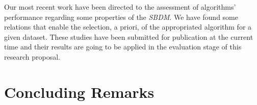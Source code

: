 \documentclass[citenumber]{elsarticle}
\begin{document}
	Our most recent work have been directed to the assessment of algorithms' performance regarding some properties of the \textit{SBDM}. We have found some relations that enable the selection, a priori, of the appropriated algorithm for a given dataset. These studies have been submitted for publication at the current time and their results are going to be applied in the evaluation stage of this research proposal. 
%
\section{Concluding Remarks}\label{conclusions}
%

  
%


\end{document}
